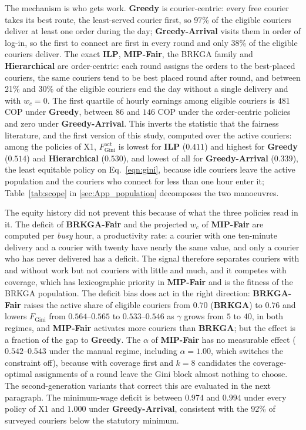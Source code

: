 \documentclass[a4paper,11pt,review,3p,authoryear]{elsarticle}
\newcommand{\FG}{F_{\text{Gini}}}
\newcommand{\FGa}{F_{\text{Gini}}^{\text{act}}}
\begin{document}
The mechanism is who gets work. \textbf{Greedy} is courier-centric: every free courier takes its best route, the least-served courier first, so 97\% of the eligible couriers deliver at least one order during the day; \textbf{Greedy-Arrival} visits them in order of log-in, so the first to connect are first in every round and only 38\% of the eligible couriers deliver. The exact \textbf{ILP}, \textbf{MIP-Fair}, the BRKGA family and \textbf{Hierarchical} are order-centric: each round assigns the orders to the best-placed couriers, the same couriers tend to be best placed round after round, and between 21\% and 30\% of the eligible couriers end the day without a single delivery and with $w_c = 0$. The first quartile of hourly earnings among eligible couriers is $481$ COP under \textbf{Greedy}, between $86$ and $146$ COP under the order-centric policies and zero under \textbf{Greedy-Arrival}. This inverts the statistic that the fairness literature, and the first version of this study, computed over the active couriers: among the policies of X1, $\FGa$ is lowest for \textbf{ILP} ($0.411$) and highest for \textbf{Greedy} ($0.514$) and \textbf{Hierarchical} ($0.530$), and lowest of all for \textbf{Greedy-Arrival} ($0.339$), the least equitable policy on Eq.~\eqref{eqn:gini}, because idle couriers leave the active population and the couriers who connect for less than one hour enter it; Table~\ref{tab:scope} in \ref{sec:App_population} decomposes the two manoeuvres.

The equity history did not prevent this because of what the three policies read in it. The deficit of \textbf{BRKGA-Fair} and the projected $w_c$ of \textbf{MIP-Fair} are computed per \emph{busy} hour, a productivity rate: a courier with one ten-minute delivery and a courier with twenty have nearly the same value, and only a courier who has never delivered has a deficit. The signal therefore separates couriers with and without work but not couriers with little and much, and it competes with coverage, which has lexicographic priority in \textbf{MIP-Fair} and is the fitness of the BRKGA population. The deficit bias does act in the right direction: \textbf{BRKGA-Fair} raises the active share of eligible couriers from $0.70$ (\textbf{BRKGA}) to $0.76$ and lowers $\FG$ from $0.564$--$0.565$ to $0.533$--$0.546$ as $\gamma$ grows from $5$ to $40$, in both regimes, and \textbf{MIP-Fair} activates more couriers than \textbf{BRKGA}; but the effect is a fraction of the gap to \textbf{Greedy}. The $\alpha$ of \textbf{MIP-Fair} has no measurable effect ($0.542$--$0.543$ under the manual regime, including $\alpha = 1.00$, which switches the constraint off), because with coverage first and $k = 8$ candidates the coverage-optimal assignments of a round leave the Gini block almost nothing to choose. The second-generation variants that correct this are evaluated in the next paragraph. The minimum-wage deficit is between $0.974$ and $0.994$ under every policy of X1 and $1.000$ under \textbf{Greedy-Arrival}, consistent with the 92\% of surveyed couriers below the statutory minimum.
\end{document}
